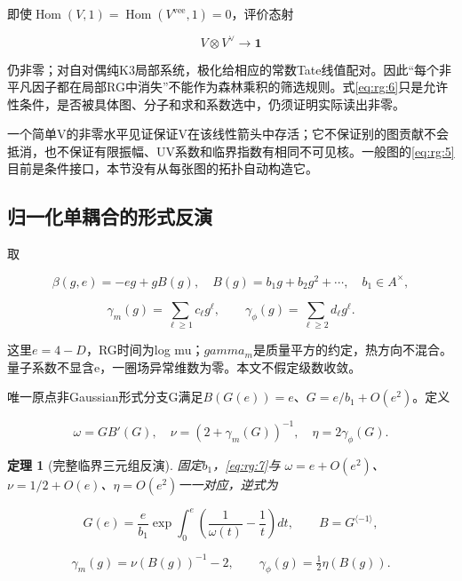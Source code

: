 \documentclass[11pt,a4paper,oneside]{ctexart}
\theoremstyle{cnplain}
\newtheorem{theorem}{定理}[section]
\theoremstyle{definition}
\theoremstyle{remark}
\numberwithin{equation}{section}
\begin{document}
即使\(\operatorname{Hom}(V,1)=\operatorname{Hom}(V^{\mathrm{vee}},1)=0\)，评价态射

\begin{equation}
V\otimes V^\vee\longrightarrow\mathbf1
\end{equation}

仍非零；对自对偶纯K3局部系统，极化给相应的常数Tate线值配对。因此``每个非平凡因子都在局部RG中消失''不能作为森林乘积的筛选规则。式\eqref{eq:rg:6}只是允许性条件，是否被具体图、分子和求和系数选中，仍须证明实际读出非零。

一个简单V的非零水平见证保证V在该线性箭头中存活；它不保证别的图贡献不会抵消，也不保证有限振幅、UV系数和临界指数有相同不可见核。一般图的\eqref{eq:rg:5}目前是条件接口，本节没有从每张图的拓扑自动构造它。


\subsection{归一化单耦合的形式反演}\label{sec:rg:4}

取

\begin{equation}
\beta(g,e)=-eg+gB(g),\quad
 B(g)=b_1g+b_2g^2+\cdots,\quad b_1\in A^\times,
\end{equation}

\begin{equation}
\gamma_m(g)=\sum_{\ell\ge1}c_\ell g^\ell,\qquad
 \gamma_\phi(g)=\sum_{\ell\ge2}d_\ell g^\ell.         \label{eq:rg:7}
\end{equation}

这里\(e=4-D\)，RG时间为log mu；\(gamma_m\)是质量平方的约定，热方向不混合。量子系数不显含e，一圈场异常维数为零。本文不假定级数收敛。

唯一原点非Gaussian形式分支G满足\(B(G(e))=e\)、\(G=e/b_1+O(e^{2})\)。定义

\begin{equation}
\omega=GB'(G),\quad
 \nu=(2+\gamma_m(G))^{-1},\quad
 \eta=2\gamma_\phi(G).                             \label{eq:rg:8}
\end{equation}

\begin{theorem}[完整临界三元组反演]

\label{thm:rg:4.1} 固定\(b_1\)，\eqref{eq:rg:7}与 \(\omega =e+O(e^{2})\)、\(\nu =1/2+O(e)\)、\(\eta =O(e^{2})\)一一对应，逆式为

\begin{equation}
G(e)=\frac e{b_1}
 \exp\int_0^e\left(\frac1{\omega(t)}-\frac1t\right)dt,\qquad
 B=G^{\langle-1\rangle},                            \label{eq:rg:9}
\end{equation}

\begin{equation}
\gamma_m(g)=\nu(B(g))^{-1}-2,\qquad
 \gamma_\phi(g)=\tfrac12\eta(B(g)).                 \label{eq:rg:10}
\end{equation}

\end{theorem}
\end{document}
